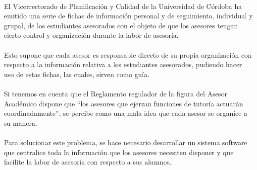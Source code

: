 \paragraph{}El Vicerrectorado de Planificación y Calidad de la Universidad de
Córdoba ha emitido una serie de fichas de información personal y de seguimiento,
individual y grupal, de los estudiantes asesorados con el objeto de que los
asesores tengan cierto control y organización durante la labor de asesoría.

\paragraph{}Esto supone que cada asesor es responsable directo de su propia
organización con respecto a la información relativa a los estudiantes
asesorados, pudiendo hacer uso de estas fichas, las cuales, sirven como guía.

\paragraph{}Si tenemos en cuenta que el Reglamento regulador de la figura del
Asesor Académico dispone que ``los asesores que ejerzan funciones de tutoría
actuarán coordinadamente'', se percibe como una mala idea que cada asesor se
organice a su manera.

\paragraph{}Para solucionar este problema, se hace necesario desarrollar un
sistema software que centralice toda la información que los asesores necesiten
disponer y que facilite la labor de asesoría con respecto a sus alumnos.
